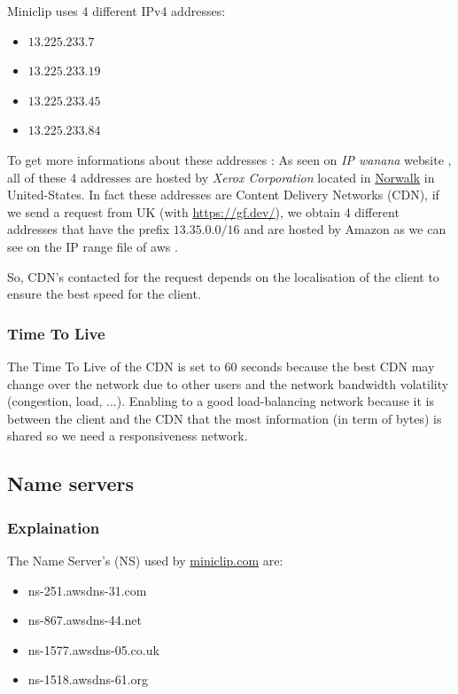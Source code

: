 \documentclass{article}
\begin{document}
\vspace{0.5cm}

Miniclip uses 4 different IPv4 addresses: 
\begin{itemize}
    \itemsep-0.1em 
    \item $13.225.233.7$
    \item $13.225.233.19$
    \item $13.225.233.45$
    \item $13.225.233.84$
\end{itemize}

To get more informations about these addresses : As seen on \textit{IP wanana} website \cite{ip}, all of these 4 addresses are hosted by \textit{Xerox Corporation} located in \href{https://goo.gl/maps/ArqaLQaFP1qYbP2j8}{Norwalk} in United-States. In fact these addresses are Content Delivery Networks (CDN), if we send a request from UK (with \url{https://gf.dev/}), we obtain 4 different addresses that have the prefix $13.35.0.0/16$ and are hosted by Amazon as we can see on the IP range file of aws \cite{awsrange}. 

So, CDN's contacted for the request depends on the localisation of the client to ensure the best speed for the client.

\subsubsection{Time To Live}
\label{subsub:ipttl}

The Time To Live of the CDN is set to 60 seconds because the best CDN may change over the network due to other users and the network bandwidth volatility (congestion, load, ...). Enabling to a good load-balancing network because it is between the client and the CDN that the most information (in term of bytes) is shared so we need a responsiveness network.

\subsection{Name servers}
\subsubsection{Explaination}
\label{subsub:nsexp}

The Name Server's (NS) used by \url{miniclip.com} are:
\begin{itemize}
    \itemsep-0.1em 
    \item ns-251.awsdns-31.com
    \item ns-867.awsdns-44.net
    \item ns-1577.awsdns-05.co.uk
    \item ns-1518.awsdns-61.org
\end{itemize}
\end{document}

